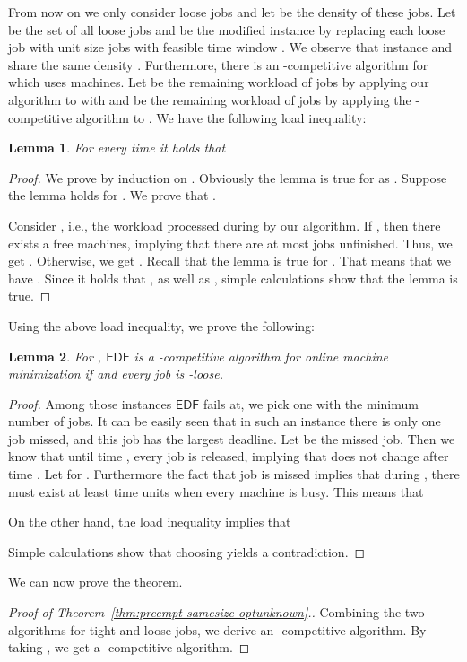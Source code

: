 \documentclass[letterpaper,11pt]{article}
\newtheorem{lemma}{Lemma}
\newcommand{\EDF}{\ensuremath{\mathsf{EDF}}\xspace}
\begin{document}
From now on we only consider loose jobs and let  be the density of these jobs. Let  be the set of all loose jobs and  be the modified instance by replacing each loose job  with  unit size jobs with feasible time window . We observe that instance  and  share the same density . Furthermore, there is an -competitive algorithm for  which uses  machines. Let  be the remaining workload of jobs by applying our algorithm to  with  and  be the remaining workload of jobs by applying the -competitive algorithm to . We have the following load inequality:
\begin{lemma}\label{loadineq}
 For every time  it holds that
 
\end{lemma}
\begin{proof}
We prove by induction on . Obviously the lemma is true for  as . Suppose the lemma holds for . We prove that . 

Consider , i.e., the workload processed during  by our algorithm. If , then there exists a free machines, implying that there are at most  jobs unfinished. Thus, we get . Otherwise, we get . Recall that the lemma is true for . That means that we have . Since it holds that ,  as well as , simple calculations show that the lemma is true.
\end{proof}

Using the above load inequality, we prove the following:
\begin{lemma}
For , \EDF is a -competitive algorithm for online machine minimization if  and every job is -loose.
\end{lemma}
\begin{proof}
Among those instances \EDF fails at, we pick one with the minimum number of jobs. It can be easily seen that in such an instance there is only one job missed, and this job has the largest deadline. Let  be the missed job. Then we know that until time , every job is released, implying that  does not change after time . Let  for .
Furthermore the fact that job  is missed implies that during , there must exist at least  time units when every machine is busy. This means that  

On the other hand, the load inequality implies that 

Simple calculations show that choosing  yields a contradiction.
\end{proof}

We can now prove the theorem.

\begin{proof}[Proof of Theorem~\ref{thm:preempt-samesize-optunknown}.]
Combining the two algorithms for tight and loose jobs, we derive an -competitive algorithm. By taking , we get a -competitive algorithm. 
\end{proof}
\end{document}
